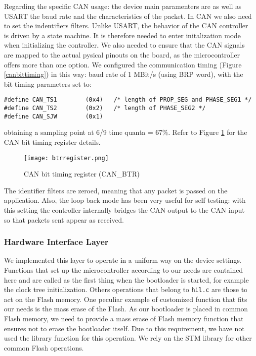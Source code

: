 \documentclass[11pt]{article} %
\begin{document}
Regarding the specific CAN usage: the device main paramenters are as well as USART the baud rate and the characteristics of the packet. In CAN we also need to set the indentifiers filters. Unlike USART, the behavior of the CAN controller is driven by a state machine. It is therefore needed to enter initalization mode when initializing the controller. We also needed to ensure that the CAN signals are mapped to the actual pysical pinouts on the board, as the microcontroller offers more than one option. We configured the communication timing (Figure \ref{canbittiming}) in this way: baud rate of 1 MBit/s (using BRP word), with the bit timing parameters set to:
\begin{verbatim}
#define CAN_TS1        (0x4)   /* length of PROP_SEG and PHASE_SEG1 */
#define CAN_TS2        (0x2)   /* length of PHASE_SEG2 */
#define CAN_SJW        (0x1)
\end{verbatim}
obtaining a sampling point at 6/9 time quanta = 67\%. Refer to Figure \ref{btrregister} for the CAN bit timing register details.
\begin{figure}[htbp]
\begin{center}
\texttt{[image: btrregister.png]}
\end{center}
\caption{CAN bit timing register (CAN\_BTR)}
\label{btrregister}
\end{figure}
The identifier filters are zeroed, meaning that any packet is passed on the application. Also, the loop back mode has been very useful for self testing: with this setting the controller internally bridges the CAN output to the CAN input so that packets sent appear as received.

\subsubsection{Hardware Interface Layer}
We implemented this layer to operate in a uniform way on the device settings. Functions that set up the microcontroller according to our needs are contained here and are called as the first thing when the bootloader is started, for example the clock tree initialization.
Others operations that belong to \texttt{hil.c} are those to act on the Flash memory. One peculiar example of customized function that fits our needs is the mass erase of the Flash. As our bootloader is placed in common Flash memory, we need to provide a mass erase of Flash memory function that ensures not to erase the bootloader itself. Due to this requirement, we have not used the library function for this operation. We rely on the STM library for other common Flash operations.
\end{document}
